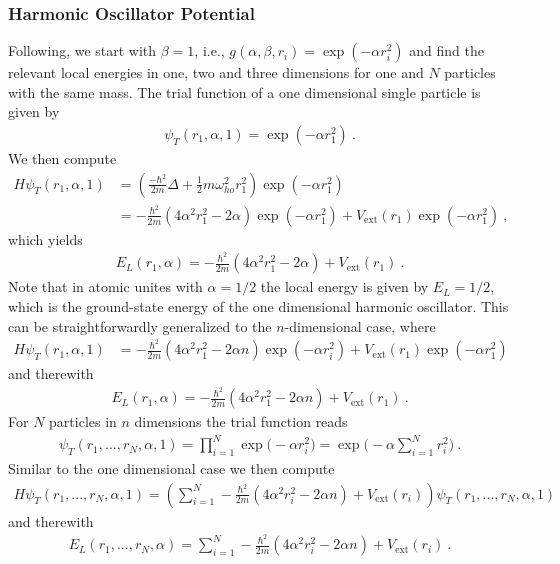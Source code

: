 \documentclass[11pt,a4paper]{article}
\numberwithin{equation}{section}
\begin{document}
\subsubsection{Harmonic Oscillator Potential}
Following, we start with $\beta =1$, i.e., $g(\alpha, \beta, r_i)=\exp(-\alpha r_i^2)$ and find the relevant local energies in one, two and three dimensions for one and $N$ particles with the same mass. 
%
The trial function of a one dimensional single particle is given by
\begin{align*}
\psi_T(r_1,\alpha,1) = \exp(-\alpha r_1^2)~.
\end{align*}
We then compute 
\begin{align*}
H\psi_T(r_1,\alpha,1)
&=
\left(\frac{-\hbar^2}{2m}\Delta +\frac{1}{2}m\omega_{ho}^2r_1^2\right)\exp(-\alpha r_1^2)\\
&=
-\frac{\hbar^2}{2m}\left(4\alpha^2r_1^2-2\alpha\right)\exp(-\alpha r_1^2)+V_{\mathrm{ext}}(r_1)\exp(-\alpha r_1^2)~,
\end{align*}
which yields 
\begin{align*}
E_L(r_1,\alpha)
=
-\frac{\hbar^2}{2m}\left(4\alpha^2r_1^2-2\alpha\right)+V_{\mathrm{ext}}(r_1)~.
\end{align*}
Note that in atomic unites with $\alpha=1/2$ the local energy is given by $E_L = 1/2$, which is the ground-state energy of the one dimensional harmonic oscillator.
% 
This can be straightforwardly generalized to the $n$-dimensional case, where
\begin{align*}
H\psi_T(r_1,\alpha,1)
&=
-\frac{\hbar^2}{2m}\left(4\alpha^2r_1^2-2\alpha n\right)\exp(-\alpha r_i^2)+V_{\mathrm{ext}}(r_1)\exp(-\alpha r_1^2)
\end{align*}
and therewith
\begin{align*}
E_L(r_1,\alpha)
=
-\frac{\hbar^2}{2m}\left(4\alpha^2r_1^2-2\alpha n\right)+V_{\mathrm{ext}}(r_1)~.
\end{align*}
For $N$ particles in $n$ dimensions the trial function reads
\begin{align*}
\psi_T(r_1,...,r_N,\alpha,1)
=
\prod_{i=1}^N\exp\big(-\alpha r_i^2\big)
=
\exp\big(-\alpha \sum_{i=1}^Nr_i^2\big)~.
\end{align*}
Similar to the one dimensional case we then compute
\begin{align*}
H\psi_T(r_1,...,r_N,\alpha,1)
=
\left(\sum_{i=1}^N-\frac{\hbar^2}{2m}\left(4\alpha^2r_i^2-2\alpha n\right)
+V_{\mathrm{ext}}(r_i)\right)\psi_T(r_1,...,r_N,\alpha,1)
\end{align*}
and therewith 
\begin{align*}
E_L(r_1,...,r_N,\alpha)
=
\sum_{i=1}^N-\frac{\hbar^2}{2m}\left(4\alpha^2r_i^2-2\alpha n\right)
+V_{\mathrm{ext}}(r_i)~.
\end{align*}
\end{document}
